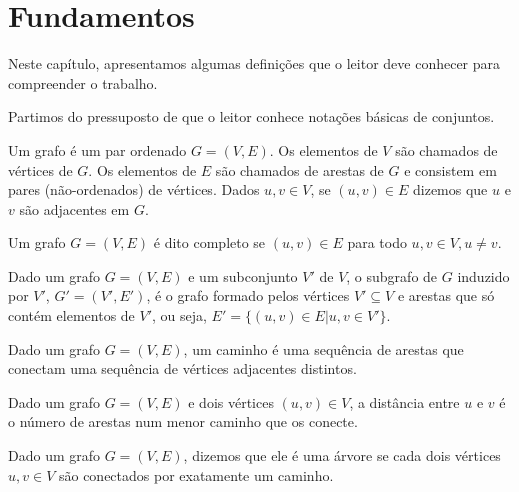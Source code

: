 \chapter{Fundamentos}
\label{cap:fundamentos}

Neste capítulo, apresentamos algumas definições que o leitor deve conhecer para compreender o trabalho.

Partimos do pressuposto de que o leitor conhece notações básicas de conjuntos.

\begin{definition}[grafo]
  \cite{defgrafo}
  Um grafo é um par ordenado $G = (V, E)$. Os elementos de $V$ são chamados de vértices de $G$. Os elementos de $E$ são chamados de arestas de $G$ e consistem em pares (não-ordenados) de vértices. Dados $u, v \in V$, se $(u, v) \in E$ dizemos que $u$ e $v$ são adjacentes em $G$.
\end{definition}

\begin{definition}
  \cite{defgrafocompleto}
  Um grafo $G = (V, E)$ é dito completo se $(u, v) \in E$ para todo $u, v \in V, u \neq v$.
\end{definition}

\begin{definition}
  \cite{defsubgrafo}
  Dado um grafo $G = (V, E)$ e um subconjunto $V'$ de $V$, o subgrafo de $G$ induzido por $V'$, $G' = (V', E')$, é o grafo formado pelos vértices $V' \subseteq V$ e arestas que só contém elementos de $V'$, ou seja, $E' = \{(u, v) \in E | u, v \in V'\}$.
\end{definition}

\begin{definition}[caminho]
  \cite{defcaminho}
  Dado um grafo $G = (V, E)$, um caminho é uma sequência de arestas que conectam uma sequência de vértices adjacentes distintos.
\end{definition}

\begin{definition}[distância]
  \cite{defdistancia}
  Dado um grafo $G = (V, E)$ e dois vértices $(u, v) \in V$, a distância entre $u$ e $v$ é o número de arestas num menor caminho que os conecte.
\end{definition}

\begin{definition}[árvore]
  \cite{defarvore}
  Dado um grafo $G = (V, E)$, dizemos que ele é uma árvore se cada dois vértices $u, v \in V$ são conectados por exatamente um caminho.
\end{definition}


